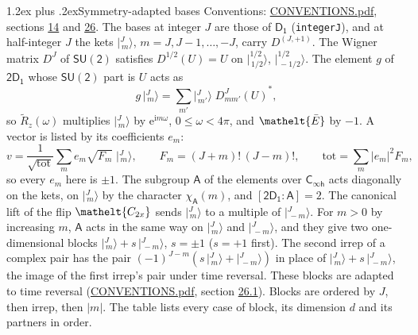 \documentclass[10pt,a4paper]{article}
\makeatletter
\renewcommand\section{\@startsection{section}{1}{\z@}{-3ex plus -1ex minus -.2ex}%
  {1.2ex plus .2ex}{\normalfont\large\sffamily\bfseries\color{parttitle}}}
\numberwithin{equation}{section}
\newcommand{\eltfont}[1]{{\let\sigma\eltsigma\mathelt{#1}}}
\newcommand{\grp}[1]{\mathsf{#1}}
\newcommand{\elt}[1]{\eltfont{#1}}
\newcommand{\grpindex}[2]{[#1 : #2]}
\newcommand{\iunit}{\mathrm{i}}
\newcommand{\expe}{\mathrm{e}}
\newcommand{\irrJp}[2]{D^{(#1,#2)}}
\newcommand{\wignerD}[1]{D^{#1}}
\newcommand{\chiA}{\chi_{\grp{A}}}
\newcommand{\conj}[1]{{#1}^{*}}
\newcommand{\jm}[2]{\bigl\lvert{}^{#1}_{\,#2}\bigr\rangle}
\newcommand{\barred}[1]{\bar{#1}}
\newcommand{\lift}[1]{\tilde{#1}}
\makeatother
\begin{document}
\section{Symmetry-adapted bases}\label{s:bases}
Conventions: \href{../../CONVENTIONS.pdf}{CONVENTIONS.pdf}, sections \href{../../../rotation/CONVENTIONS.pdf\#conv.14}{14} and \href{../../CONVENTIONS.pdf\#conv.26}{26}.
\leavevmode\label{n:index.m}\label{n:vector.ket}The bases at integer $J$ are those of \href{../../../rotation/data/pdf/D1.pdf}{$\grp{D_{1}}$} (\texttt{integerJ}), and at half-integer $J$ the kets $\jm{J}{m}$, $m = J, J-1, \dots, -J$, carry $\irrJp{J}{+1}$. \label{n:matrix.wigner}The Wigner matrix $\wignerD{J}$ of $\grp{SU(2)}$ satisfies $\wignerD{1/2}(U) = U$ on $\jm{1/2}{1/2}$, $\jm{1/2}{-1/2}$. The element $g$ of $\grp{2D_{1}}$ whose $\grp{SU(2)}$ part is $U$ acts as
\begin{equation}\label{e:action}g\,\jm{J}{m} = \sum_{m'} \jm{J}{m'}\; \conj{\wignerD{J}_{m m'}(U)},\end{equation}
so $\lift{R}_{z}(\omega)$ multiplies $\jm{J}{m}$ by $\expe^{\iunit m\omega}$, $0 \le \omega < 4\pi$, and $\elt{\barred{E}}$ by $-1$. \label{n:index.ketcoefficient}\label{n:vector.basis.symmetry}\label{n:index.ketweight}\label{n:index.total}A vector is listed by its coefficients $e_m$:
\begin{equation}\label{e:ket}v = \frac{1}{\sqrt{\mathrm{tot}}}\sum_m e_m\sqrt{F_m}\;\jm{J}{m},\qquad F_m = (J+m)!\,(J-m)!,\qquad \mathrm{tot} = \sum_m |e_m|^2F_m,\end{equation}
so every $e_m$ here is $\pm 1$.
\leavevmode\label{n:group.A}\label{n:function.character.abelian}The subgroup $\grp{A}$ of the elements over $\grp{C_{\infty h}}$ acts diagonally on the kets, on $\jm{J}{m}$ by the character $\chiA(m)$, and $\grpindex{\grp{2D_{1}}}{\grp{A}} = 2$. The canonical lift of the flip $\elt{C_{2x}}$ sends $\jm{J}{m}$ to a multiple of $\jm{J}{-m}$. \label{n:index.pair.sign}For $m > 0$ by increasing $m$, $\grp{A}$ acts in the same way on $\jm{J}{m}$ and $\jm{J}{-m}$, and they give two one-dimensional blocks $\jm{J}{m} + s\,\jm{J}{-m}$, $s = \pm 1$ ($s = +1$ first). The second irrep of a complex pair has the pair $(-1)^{J-m}(s\,\jm{J}{m} + \jm{J}{-m})$ in place of $\jm{J}{m} + s\,\jm{J}{-m}$, the image of the first irrep's pair under time reversal. These blocks are adapted to time reversal (\href{../../CONVENTIONS.pdf}{CONVENTIONS.pdf}, section \href{../../CONVENTIONS.pdf\#conv.26.1}{26.1}). Blocks are ordered by $J$, then irrep, then $|m|$.
\leavevmode\label{n:head.case}\label{n:head.partners}The table lists every case of block, its dimension $d$ and its partners in order.
\end{document}
